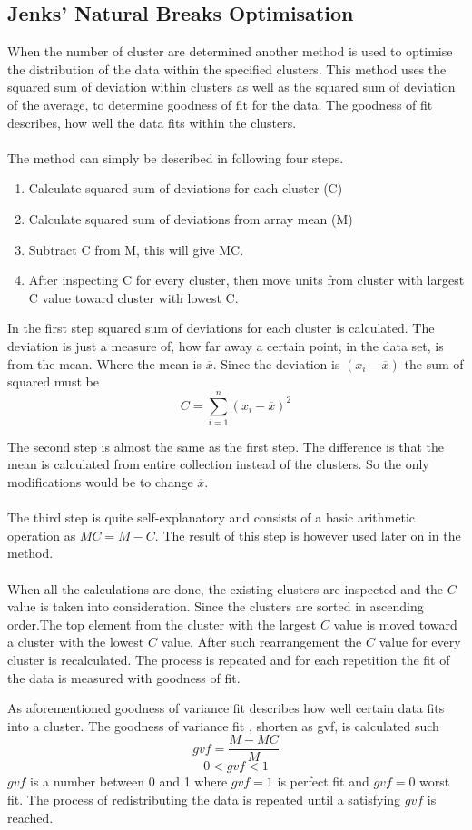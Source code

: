 \subsection{Jenks' Natural Breaks Optimisation}
\label{sub:jenks} 
When the number of cluster are determined another method is used to optimise the distribution of the data within the specified clusters. This method uses the squared sum of deviation within clusters as well as the squared sum of deviation of the average, to determine goodness of fit for the data. The goodness of fit describes, how well the data fits within the clusters.
\\\\
The method can simply be described in following four steps.
\begin{enumerate}
  \item Calculate squared sum of deviations for each cluster (C)
  \item Calculate squared sum of deviations from array mean (M)
  \item Subtract C from M, this will give MC.
  \item After inspecting C for every cluster, then move units from cluster with largest C value toward cluster with lowest C.
\end{enumerate}
In the first step squared sum of deviations for each cluster is calculated. The deviation is just a measure of, how far away a certain point, in the data set, is from the mean. Where the mean is $\overline{x}$. Since the deviation is $(x_i-\overline{x})$ the sum of squared must be $$C= \displaystyle\sum_{i=1}^{n}(x_i-\overline{x})^2$$

The second step is almost the same as the first step. The difference  is that the mean is calculated from entire collection instead of the clusters. So the only modifications would be to change $\overline{x}$.
\\\\
The third step is quite self-explanatory and consists of a basic arithmetic operation as $MC = M-C$. The result of this step is however used later on in the method.
\\\\
When all the calculations are done, the existing clusters are inspected and the $C$ value is taken into consideration. Since the clusters are sorted in ascending order.The top element from the cluster with the largest $C$ value is moved toward a cluster with the lowest $C$ value. After such rearrangement the $C$ value for every cluster is recalculated. The process is repeated and for each repetition the fit of the data is measured with goodness of fit.


As aforementioned goodness of variance fit describes how well certain data fits into a cluster. The goodness of variance fit , shorten as gvf, is calculated such $$gvf = \frac{M-MC}{M}$$
$$0<gvf<1$$
$gvf$ is a number between 0 and 1 where $gvf = 1$ is perfect fit and $gvf = 0$ worst fit.
The process of redistributing the data is repeated until a satisfying $gvf$ is reached.